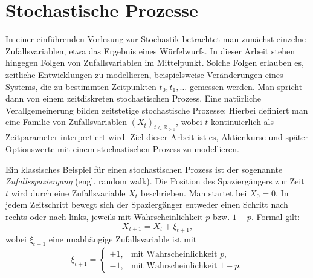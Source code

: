 \section{Stochastische Prozesse}

In einer einführenden Vorlesung zur Stochastik betrachtet man zunächst einzelne Zufallsvariablen, 
etwa das Ergebnis eines Würfelwurfs. In dieser Arbeit stehen hingegen Folgen von 
Zufallsvariablen im Mittelpunkt. Solche Folgen erlauben es, zeitliche Entwicklungen zu modellieren,
beispielsweise Veränderungen eines Systems, die zu bestimmten Zeitpunkten $t_0, t_1, \dots$ gemessen werden.
Man spricht dann von einem zeitdiskreten stochastischen Prozess. Eine natürliche 
Verallgemeinerung bilden zeitstetige stochastische Prozesse: Hierbei definiert man eine 
Familie von Zufallsvariablen $(X_t)_{t \in \mathbb{R}_{\ge 0}}$, wobei $t$ kontinuierlich als 
Zeitparameter interpretiert wird. Ziel dieser Arbeit ist es, Aktienkurse und später Optionswerte mit einem stochastischen Prozess 
zu modellieren.

\begin{bsp}[Zufallsspaziergang]
Ein klassisches Beispiel für einen stochastischen Prozess ist der sogenannte \textit{Zufallsspaziergang} (engl. random walk).
Die Position des Spaziergängers zur Zeit $t$ wird durch eine Zufallsvariable $X_t$ beschrieben. 
Man startet bei $X_0 = 0$. In jedem Zeitschritt bewegt sich der Spaziergänger entweder 
einen Schritt nach rechts oder nach links, jeweils mit Wahrscheinlichkeit $p$ bzw. $1-p$. 
Formal gilt:
$$
X_{t+1} = X_t + \xi_{t+1},
$$
wobei $\xi_{t+1}$ eine unabhängige Zufallsvariable ist mit
$$
\xi_{t+1} = 
\begin{cases} 
+1, & \text{mit Wahrscheinlichkeit } p, \\
-1, & \text{mit Wahrscheinlichkeit } 1-p.
\end{cases}
$$

\end{bsp}


